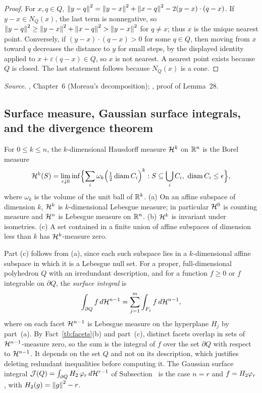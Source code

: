\begin{proof}
For \(x,q\in Q\), \(\left\lVert y-q\right\rVert^2=\left\lVert y-x\right\rVert^2+\left\lVert x-q\right\rVert^2-2(y-x)\cdot(q-x)\).
If \(y-x\in N_Q(x)\), the last term is nonnegative, so
\(\left\lVert y-q\right\rVert^2\ge\left\lVert y-x\right\rVert^2+\left\lVert x-q\right\rVert^2>\left\lVert y-x\right\rVert^2\) for \(q\ne x\); thus
\(x\) is the unique nearest point. Conversely, if \((y-x)\cdot(q-x)>0\) for
some \(q\in Q\), then moving from \(x\) toward \(q\) decreases the distance
to \(y\) for small steps, by the displayed identity applied to
\(x+\varepsilon(q-x)\in Q\), so \(x\) is not nearest. A nearest point exists
because \(Q\) is closed. The last statement follows because \(N_Q(x)\) is a
cone.
\end{proof}

\emph{Source.} , Chapter~6 (Moreau's decomposition); ,
proof of Lemma~28.

\subsection{Surface measure, Gaussian surface integrals, and the
divergence theorem}\label{tb:sec:surface}

\begin{fact}\label{tb:hausdorff}
For \(0\le k\le n\), the \(k\)-dimensional Hausdorff measure \(\mathcal H^k\) on
\(\mathbb R^n\) is the Borel measure
\[
 \mathcal H^k(S)=\lim_{\epsilon\downarrow0}\inf\Bigl\{\sum_i\omega_k
 \Bigl(\tfrac12\operatorname{diam}C_i\Bigr)^k:S\subseteq\bigcup_iC_i,\
 \operatorname{diam}C_i\le\epsilon\Bigr\},
\]
where \(\omega_k\) is the volume of the unit ball of \(\mathbb R^k\). (a) On an
affine subspace of dimension \(k\), \(\mathcal H^k\) is \(k\)-dimensional Lebesgue
measure; in particular \(\mathcal H^0\) is counting measure and \(\mathcal H^n\) is
Lebesgue measure on \(\mathbb R^n\). (b) \(\mathcal H^k\) is invariant under isometries.
(c) A set contained in a finite union of affine subspaces of dimension less
than \(k\) has \(\mathcal H^k\)-measure zero.
\end{fact}

Part (c) follows from (a), since each such subspace lies in a
\(k\)-dimensional affine subspace in which it is a Lebesgue null set. For a
proper, full-dimensional polyhedron \(Q\) with an irredundant description,
and for a function \(f\ge0\) or \(f\) integrable on \(\partial Q\), the
\emph{surface integral} is
\[
 \int_{\partial Q}f\,d\mathcal H^{n-1}=\sum_{j=1}^m\int_{F_j}f\,d\mathcal H^{n-1},
\]
where on each facet \(\mathcal H^{n-1}\) is Lebesgue measure on the hyperplane
\(H_j\) by part~(a). By Fact~\ref{tb:facets}(b) and part~(c), distinct
facets overlap in sets of \(\mathcal H^{n-1}\)-measure zero, so the sum is the
integral of \(f\) over the set \(\partial Q\) with respect to
\(\mathcal H^{n-1}\). It depends on the set \(Q\) and not on its description,
which justifies deleting redundant inequalities before computing it.
The Gaussian surface integral \(\mathcal J(Q)=\int_{\partial Q}H_2\,\varphi_r\,
d\mathcal H^{r-1}\) of Subsection~\PN{sec:outline-late}{2.4} is the case
\(n=r\) and \(f=H_2\varphi_r\), with \(H_2(g)=\left\lVert g\right\rVert^2-r\).


